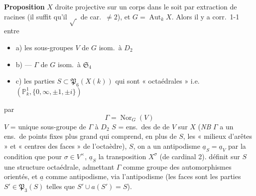\documentclass[11pt,a4paper]{article}
\begin{document}
\textbf{Proposition} \struck{\ill{}}  $X$ droite projective
 sur un corps \ill{} dans le \ill{} soit
 par extraction de racines (il suffit qu'il
 \ill{}  $\sqrt{\ }$ de car.\ $\neq 2$), et
$G = \operatorname{Aut}_{k} X$. Alors il y a corr.\ 1-1 entre
\begin{itemize}
  \item a) les sous-groupes $V$ de $G$ isom.\ à $D_{2}$
  \item b) — $\Gamma$ de $G$ isom.\ à $\mathfrak{S}_{4}$
    \struck{\ill{}}
  \item c) les parties $S \subset \mathfrak{P}_{6}(X(k))$ qui sont
    « octaédrales » i.e.\  
    $(\mathbb{P}^{1}_{k}, \{0, \infty, \pm 1, \pm i\})$
\end{itemize}
par
\[
  \Gamma = \operatorname{Nor}_{G}(V)
\]
$V$ = unique sous-groupe  de $\Gamma$ 
à $D_{2}$
$S$ = ens.\ des  de  de $V$ sur
$X$ \struck{\ill{}}
(\emph{NB} $\Gamma$ a un ens.\ de points fixes plus grand qui comprend,
en plus de $S$, les « milieux d'arêtes » et « centres des faces » de
l'octaèdre),
\ill{} $S$, on a un antipodisme $\underline{a}_{S} = \underline{a}_{V}$ \ill{}
par la condition que pour $\sigma \in V^{\times}$, $\underline{a}_{S}$
  la transposition \ill{} $X^{\sigma}$ (de cardinal 2).
 définit sur $S$ une structure octaédrale, admettant $\Gamma$ comme
groupe des automorphismes orientés, et $\underline{a}$ comme antipodisme, via
l'antipodisme (les faces sont les parties $S' \in \mathfrak{P}_{3}(S)$ telles
que $S' \cup a(S') = S$).

\end{document}
